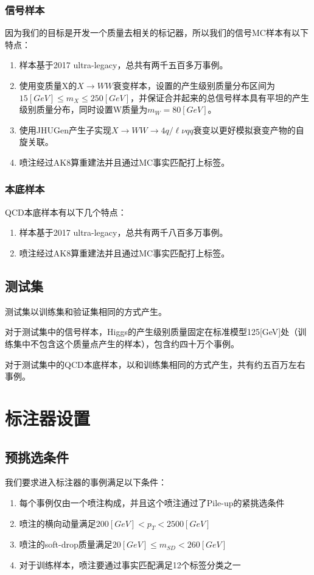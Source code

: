 \subsubsection{信号样本}
因为我们的目标是开发一个质量去相关的标记器，所以我们的信号MC样本有以下特点：
\begin{enumerate}
    \item 样本基于2017 ultra-legacy，总共有两千五百多万事例。
    \item 使用变质量X的$X\to WW$衰变样本，设置的产生级别质量分布区间为$15 [\si{GeV}]\leq m_X\leq 250[\si{GeV}]$，并保证合并起来的总信号样本具有平坦的产生级别质量分布，同时设置W质量为$m_W=80[\si{GeV}]$。
    \item 使用JHUGen产生子实现$X\to WW\to4q/\ell \nu qq$衰变以更好模拟衰变产物的自旋关联。
    \item 喷注经过AK8算重建法并且通过MC事实匹配打上标签。
\end{enumerate}

\subsubsection{本底样本}
QCD本底样本有以下几个特点：
\begin{enumerate}
    \item 样本基于2017 ultra-legacy，总共有两千八百多万事例。
    \item 喷注经过AK8算重建法并且通过MC事实匹配打上标签。
\end{enumerate}
\subsection{测试集}
测试集以训练集和验证集相同的方式产生。

对于测试集中的信号样本，Higgs的产生级别质量固定在标准模型125[GeV]处（训练集中不包含这个质量点产生的样本），包含约四十万个事例。

对于测试集中的QCD本底样本，以和训练集相同的方式产生，共有约五百万左右事例。


\section{标注器设置}
\subsection{预挑选条件}
我们要求进入标注器的事例满足以下条件：
\begin{enumerate}
    \item 每个事例仅由一个喷注构成，并且这个喷注通过了Pile-up的紧挑选条件
    \item 喷注的横向动量满足$200[\si{GeV}]<p_T<2500[\si{GeV}]$
    \item 喷注的soft-drop质量满足$20[\si{GeV}]\leq m_{SD}<260[\si{GeV}]$
    \item 对于训练样本，喷注要通过事实匹配满足12个标签分类之一
\end{enumerate}
